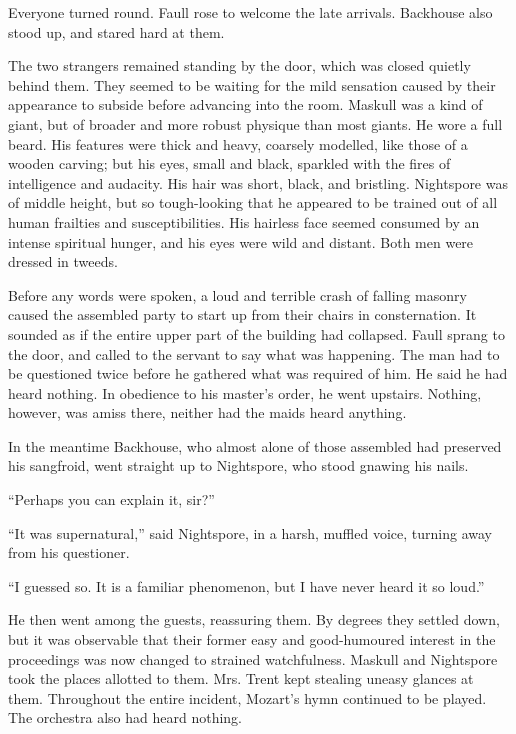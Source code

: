 Everyone turned round. Faull rose to welcome the late arrivals. Backhouse also stood up, and stared hard at them.

The two strangers remained standing by the door, which was closed quietly behind them. They seemed to be waiting for the mild sensation caused by their appearance to subside before advancing into the room. Maskull was a kind of giant, but of broader and more robust physique than most giants. He wore a full beard. His features were thick and heavy, coarsely modelled, like those of a wooden carving; but his eyes, small and black, sparkled with the fires of intelligence and audacity. His hair was short, black, and bristling. Nightspore was of middle height, but so tough-looking that he appeared to be trained out of all human frailties and susceptibilities. His hairless face seemed consumed by an intense spiritual hunger, and his eyes were wild and distant. Both men were dressed in tweeds.

Before any words were spoken, a loud and terrible crash of falling masonry caused the assembled party to start up from their chairs in consternation. It sounded as if the entire upper part of the building had collapsed. Faull sprang to the door, and called to the servant to say what was happening. The man had to be questioned twice before he gathered what was required of him. He said he had heard nothing. In obedience to his master's order, he went upstairs. Nothing, however, was amiss there, neither had the maids heard anything.

In the meantime Backhouse, who almost alone of those assembled had preserved his sangfroid, went straight up to Nightspore, who stood gnawing his nails.

``Perhaps you can explain it, sir?''

``It was supernatural,'' said Nightspore, in a harsh, muffled voice, turning away from his questioner.

``I guessed so. It is a familiar phenomenon, but I have never heard it so loud.''

He then went among the guests, reassuring them. By degrees they settled down, but it was observable that their former easy and good-humoured interest in the proceedings was now changed to strained watchfulness. Maskull and Nightspore took the places allotted to them. Mrs. Trent kept stealing uneasy glances at them. Throughout the entire incident, Mozart's hymn continued to be played. The orchestra also had heard nothing.

